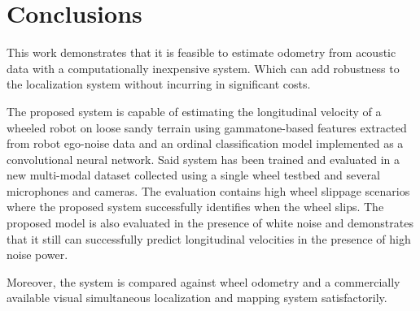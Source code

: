 \section{Conclusions} \label{chap:conclusions}



This work demonstrates that it is feasible to estimate odometry from acoustic
data with a computationally inexpensive system. Which can add robustness to the
localization system without incurring in significant costs. 

The proposed system is capable of estimating the longitudinal velocity of a
wheeled robot on loose sandy terrain using gammatone-based features extracted
from robot ego-noise data and an ordinal classification model implemented as a
convolutional neural network. Said system has been trained and evaluated in a
new multi-modal dataset collected using a single wheel testbed and several
microphones and cameras. The evaluation contains high wheel slippage scenarios
where the proposed system successfully identifies when the wheel slips. The
proposed model is also evaluated in the presence of white noise and
demonstrates that it still can successfully predict longitudinal velocities in
the presence of high noise power. 






Moreover, the system is compared against
wheel odometry and a commercially available visual simultaneous localization
and mapping system satisfactorily.

